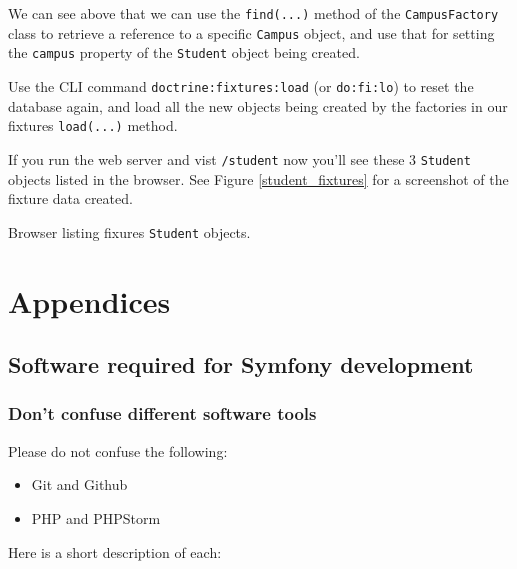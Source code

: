 \documentclass[a4paperpaper,openright]{book}
\providecommand{\tightlist}{%
  \setlength{\itemsep}{0pt}\setlength{\parskip}{0pt}}
\begin{document}
We can see above that we can use the \texttt{find(...)} method of the
\texttt{CampusFactory} class to retrieve a reference to a specific
\texttt{Campus} object, and use that for setting the \texttt{campus}
property of the \texttt{Student} object being created.

Use the CLI command \texttt{doctrine:fixtures:load} (or
\texttt{do:fi:lo}) to reset the database again, and load all the new
objects being created by the factories in our fixtures
\texttt{load(...)} method.

If you run the web server and vist \texttt{/student} now you'll see
these 3 \texttt{Student} objects listed in the browser. See Figure
\ref{student_fixtures} for a screenshot of the fixture data created.

{Browser listing fixures \texttt{Student}
objects.\label{student_fixtures}}

\part{Appendices}

\appendix

\hypertarget{software-required-for-symfony-development}{%
\chapter{\texorpdfstring{Software required for Symfony
development\label{appendix_software}}{Software required for Symfony development}}\label{software-required-for-symfony-development}}

\hypertarget{dont-confuse-different-software-tools}{%
\section{Don't confuse different software
tools}\label{dont-confuse-different-software-tools}}

Please do not confuse the following:

\begin{itemize}
\tightlist
\item
  Git and Github
\item
  PHP and PHPStorm
\end{itemize}

Here is a short description of each:
\end{document}
